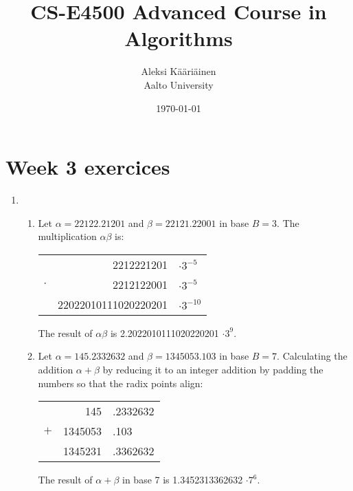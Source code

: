 \documentclass[11pt,a4paper]{article}
\title{CS-E4500 Advanced Course in Algorithms}
\author{Aleksi Kääriäinen  \\
	Aalto University  \\
	}
\begin{document}
\date{\today}

\maketitle

\newpage

\section*{Week 3 exercices}

\begin{enumerate}
    \item
          \begin{enumerate}
              \item Let $\alpha= 22122.21201$ and $\beta = 22121.22001$ in base $B = 3$. The multiplication $\alpha \beta$ is:
                    \begin{center}
                        \begin{tabular}{crl}
                                    & 2212221201           & $\cdot 3^{-5}$  \\
                            $\cdot$ & 2212122001           & $\cdot 3^{-5}$  \\
                            \hline
                                    & 22022010111020220201 & $\cdot 3^{-10}$ \\
                        \end{tabular}
                    \end{center}
                    The result of $\alpha \beta$ is 2.2022010111020220201 $\cdot 3^{9}$.

              \item Let $\alpha = 145.2332632$ and $\beta = 1345053.103$ in base $B = 7$. Calculating the addition $\alpha + \beta$
                    by reducing it to an integer addition by padding the numbers so that the radix points align:
                    \begin{center}
                        \begin{tabular}{crl}
                                & 145     & .2332632 \\
                            $+$ & 1345053 & .103     \\
                            \hline
                                & 1345231 & .3362632 \\
                        \end{tabular}
                    \end{center}
                    The result of $\alpha + \beta$ in base 7 is 1.3452313362632 $\cdot 7^{6}$.
          \end{enumerate}
          \newpage


\end{enumerate}
\end{document}
